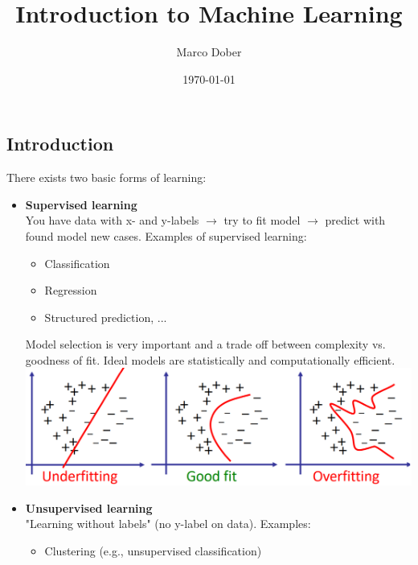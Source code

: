 \documentclass[a4paper, fontsize=8pt, landscape, DIV=1]{scrartcl}
\title{Introduction to Machine Learning}
\author{Marco Dober}
\date{\today}
\begin{document}
	\setcounter{secnumdepth}{3} %
	\begin{multicols*}{4}

		\maketitle 
		\thispagestyle{fancy}
		
		\section{Introduction}
		There exists two basic forms of learning:
		\begin{itemize}[noitemsep]
			\item \textbf{Supervised learning}\\
			You have data with x- and y-labels $\rightarrow$ try to fit model $\rightarrow$ predict with found model new cases. Examples of supervised learning:
			\begin{itemize}
				\item Classification
				\item Regression
				\item Structured prediction, ...
			\end{itemize}
			Model selection is very important and a trade off between complexity vs. goodness of fit. Ideal models are statistically and computationally efficient. 
			\includegraphics[width=\columnwidth]{images/Introduction/model_selection.png}
			\item \textbf{Unsupervised learning}\\
			"Learning without labels" (no y-label on data). Examples:
			\begin{itemize}[noitemsep]
				\item Clustering (e.g., unsupervised classification)

\end{itemize}
\end{itemize}
\end{multicols*}
\end{document}
